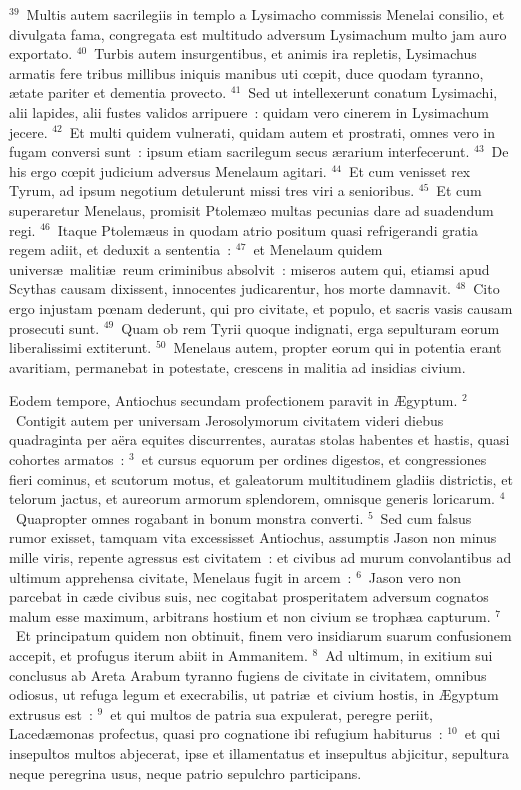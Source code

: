 ${}^{39}$~Multis autem sacrilegiis in templo a Lysimacho commissis Menelai consilio, et divulgata fama, congregata est multitudo adversum Lysimachum multo jam auro exportato.
${}^{40}$~Turbis autem insurgentibus, et animis ira repletis, Lysimachus armatis fere tribus millibus iniquis manibus uti cœpit, duce quodam tyranno, \ae tate pariter et dementia provecto.
${}^{41}$~Sed ut intellexerunt conatum Lysimachi, alii lapides, alii fustes validos arripuere~: quidam vero cinerem in Lysimachum jecere.
${}^{42}$~Et multi quidem vulnerati, quidam autem et prostrati, omnes vero in fugam conversi sunt~: ipsum etiam sacrilegum secus \ae rarium interfecerunt.
${}^{43}$~De his ergo cœpit judicium adversus Menelaum agitari.
${}^{44}$~Et cum venisset rex Tyrum, ad ipsum negotium detulerunt missi tres viri a senioribus.
${}^{45}$~Et cum superaretur Menelaus, promisit Ptolem\ae o multas pecunias dare ad suadendum regi.
${}^{46}$~Itaque Ptolem\ae us in quodam atrio positum quasi refrigerandi gratia regem adiit, et deduxit a sententia~:
${}^{47}$~et Menelaum quidem univers\ae\ maliti\ae\ reum criminibus absolvit~: miseros autem qui, etiamsi apud Scythas causam dixissent, innocentes judicarentur, hos morte damnavit.
${}^{48}$~Cito ergo injustam pœnam dederunt, qui pro civitate, et populo, et sacris vasis causam prosecuti sunt.
${}^{49}$~Quam ob rem Tyrii quoque indignati, erga sepulturam eorum liberalissimi extiterunt.
${}^{50}$~Menelaus autem, propter eorum qui in potentia erant avaritiam, permanebat in potestate, crescens in malitia ad insidias civium.

\lettrine[lines=3,image=true,loversize=0.05,lraise=-0.03]{E}{}odem tempore, Antiochus secundam profectionem paravit in \AE gyptum.
${}^{2}$~Contigit autem per universam Jerosolymorum civitatem videri diebus quadraginta per a\"era equites discurrentes, auratas stolas habentes et hastis, quasi cohortes armatos~:
${}^{3}$~et cursus equorum per ordines digestos, et congressiones fieri cominus, et scutorum motus, et galeatorum multitudinem gladiis districtis, et telorum jactus, et aureorum armorum splendorem, omnisque generis loricarum.
${}^{4}$~Quapropter omnes rogabant in bonum monstra converti.
${}^{5}$~Sed cum falsus rumor exisset, tamquam vita excessisset Antiochus, assumptis Jason non minus mille viris, repente agressus est civitatem~: et civibus ad murum convolantibus ad ultimum apprehensa civitate, Menelaus fugit in arcem~:
${}^{6}$~Jason vero non parcebat in c\ae de civibus suis, nec cogitabat prosperitatem adversum cognatos malum esse maximum, arbitrans hostium et non civium se troph\ae a capturum.
${}^{7}$~Et principatum quidem non obtinuit, finem vero insidiarum suarum confusionem accepit, et profugus iterum abiit in Ammanitem.
${}^{8}$~Ad ultimum, in exitium sui conclusus ab Areta Arabum tyranno fugiens de civitate in civitatem, omnibus odiosus, ut refuga legum et execrabilis, ut patri\ae\ et civium hostis, in \AE gyptum extrusus est~:
${}^{9}$~et qui multos de patria sua expulerat, peregre periit, Laced\ae monas profectus, quasi pro cognatione ibi refugium habiturus~:
${}^{10}$~et qui insepultos multos abjecerat, ipse et illamentatus et insepultus abjicitur, sepultura neque peregrina usus, neque patrio sepulchro participans.


